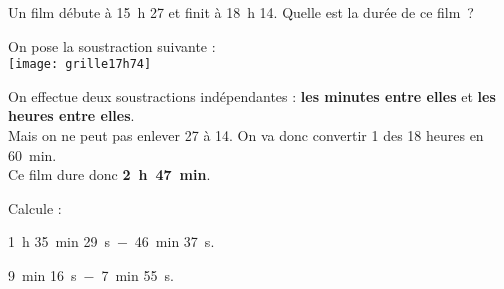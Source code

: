 \begin{methode*1}

\begin{exemple*1}
Un film débute à 15 h 27 et finit à 18 h 14. Quelle est la durée de ce film ? \\[1em]

\begin{minipage}[t]{.34\textwidth}
On pose la soustraction suivante :\\[0.2em]

\texttt{[image: grille17h74]}
\end{minipage}\hfill%
\begin{minipage}[t]{.60\textwidth}
On effectue deux soustractions indépendantes : 
\textcolor{vert}{\textbf{les minutes entre elles}} et \textcolor{bleu}{\textbf{les heures entre elles}}.\\[0.75em]
Mais on ne peut pas enlever 27 à 14. 
On va donc convertir 1 des 18 heures en 60 min. \\[0.75em]
Ce film dure donc \textcolor{rose}{\textbf{2 h 47 min}}.
\end{minipage}

\end{exemple*1}

\exercice

Calcule :

1 h 35 min 29 s $-$ 46 min 37 s.

\vspace{1em}

9 min 16 s $-$ 7 min 55 s.


\end{methode*1}
